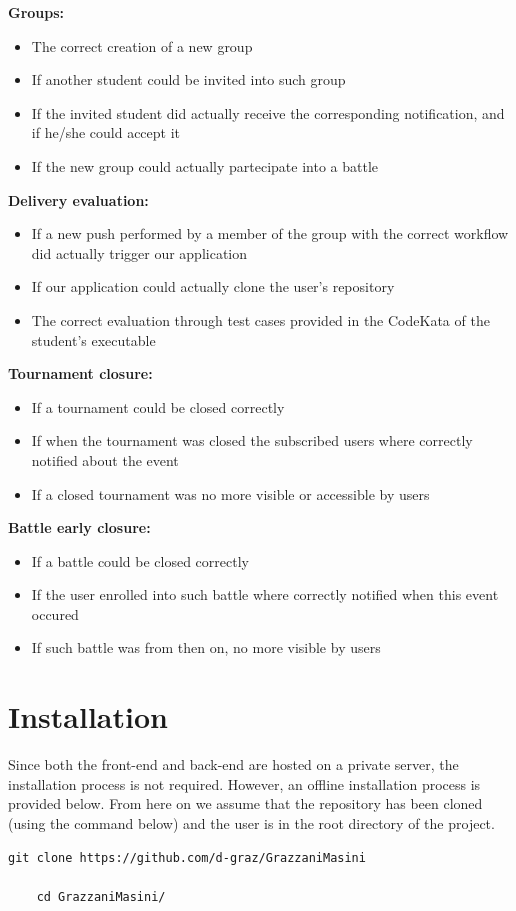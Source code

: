 \documentclass[table, 12pt]{article}
\begin{document}
\restoregeometry
\textbf{Groups:}
\begin{itemize}
    \item The correct creation of a new group
    \item If another student could be invited into such group
    \item If the invited student did actually receive the corresponding notification, and if he/she could accept it
    \item If the new group could actually partecipate into a battle
\end{itemize}
\textbf{Delivery evaluation:}
\begin{itemize}
    \item If a new push performed by a member of the group with the correct workflow did actually trigger our application
    \item If our application could actually clone the user's repository
    \item The correct evaluation through test cases provided in the CodeKata of the student's executable
\end{itemize}
\textbf{Tournament closure:}
\begin{itemize}
    \item If a tournament could be closed correctly
    \item If when the tournament was closed the subscribed users where correctly notified about the event
    \item If a closed tournament was no more visible or accessible by users
\end{itemize}
\textbf{Battle early closure:}
\begin{itemize}
    \item If a battle could be closed correctly
    \item If the user enrolled into such battle where correctly notified when this event occured
    \item If such battle was from then on, no more visible by users
\end{itemize}



\section{Installation}
Since both the front-end and back-end are hosted on a private server, the installation process is not required. However, an offline installation process is provided below.
From here on we assume that the repository has been cloned (using the command below) and the user is in the root directory of the project.
\begin{lstlisting}[]
    git clone https://github.com/d-graz/GrazzaniMasini

    cd GrazzaniMasini/
\end{lstlisting}
\end{document}

